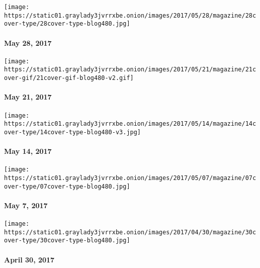 \href{https://www.nytimes3xbfgragh.onion/issue/magazine/2017/05/26/magazine-index-20170528}{}

\texttt{[image: https://static01.graylady3jvrrxbe.onion/images/2017/05/28/magazine/28cover-type/28cover-type-blog480.jpg]}

\hypertarget{may-28-2017}{%
\paragraph{May 28, 2017}\label{may-28-2017}}

\href{https://www.nytimes3xbfgragh.onion/issue/magazine/2017/05/19/magazine-index-20170521}{}

\texttt{[image: https://static01.graylady3jvrrxbe.onion/images/2017/05/21/magazine/21cover-gif/21cover-gif-blog480-v2.gif]}

\hypertarget{may-21-2017}{%
\paragraph{May 21, 2017}\label{may-21-2017}}

\href{https://www.nytimes3xbfgragh.onion/issue/magazine/2017/05/12/the-51417-issue-20170514}{}

\texttt{[image: https://static01.graylady3jvrrxbe.onion/images/2017/05/14/magazine/14cover-type/14cover-type-blog480-v3.jpg]}

\hypertarget{may-14-2017}{%
\paragraph{May 14, 2017}\label{may-14-2017}}

\href{https://www.nytimes3xbfgragh.onion/issue/magazine/2017/05/05/magazine-index-20170507}{}

\texttt{[image: https://static01.graylady3jvrrxbe.onion/images/2017/05/07/magazine/07cover-type/07cover-type-blog480.jpg]}

\hypertarget{may-7-2017}{%
\paragraph{May 7, 2017}\label{may-7-2017}}

\href{https://www.nytimes3xbfgragh.onion/issue/magazine/2017/04/28/magazine-index-20170430}{}

\texttt{[image: https://static01.graylady3jvrrxbe.onion/images/2017/04/30/magazine/30cover-type/30cover-type-blog480.jpg]}

\hypertarget{april-30-2017}{%
\paragraph{April 30, 2017}\label{april-30-2017}}

